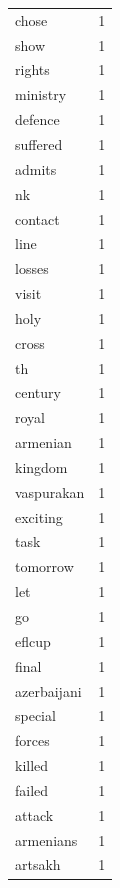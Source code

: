 \begin{tabular}{lr}
chose & 1 \\
show & 1 \\
rights & 1 \\
ministry & 1 \\
defence & 1 \\
suffered & 1 \\
admits & 1 \\
nk & 1 \\
contact & 1 \\
line & 1 \\
losses & 1 \\
visit & 1 \\
holy & 1 \\
cross & 1 \\
th & 1 \\
century & 1 \\
royal & 1 \\
armenian & 1 \\
kingdom & 1 \\
vaspurakan & 1 \\
exciting & 1 \\
task & 1 \\
tomorrow & 1 \\
let & 1 \\
go & 1 \\
eflcup & 1 \\
final & 1 \\
azerbaijani & 1 \\
special & 1 \\
forces & 1 \\
killed & 1 \\
failed & 1 \\
attack & 1 \\
armenians & 1 \\
artsakh & 1 \\
\bottomrule
\end{tabular}
